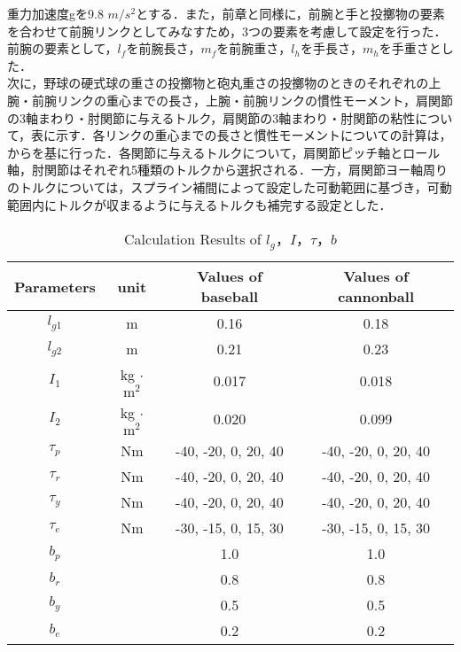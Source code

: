 重力加速度gを9.8 $m/s^{2}$とする．また，前章と同様に，前腕と手と投擲物の要素を合わせて前腕リンクとしてみなすため，3つの要素を考慮して設定を行った．
前腕の要素として，$l_{f}$を前腕長さ，$m_{f}$を前腕重さ，$l_{h}$を手長さ，$m_{h}$を手重さとした．\\

次に，野球の硬式球の重さの投擲物と砲丸重さの投擲物のときのそれぞれの上腕・前腕リンクの重心までの長さ，上腕・前腕リンクの慣性モーメント，肩関節の3軸まわり・肘関節に与えるトルク，肩関節の3軸まわり・肘関節の粘性について，表に示す．各リンクの重心までの長さと慣性モーメントについての計算は，からを基に行った．各関節に与えるトルクについて，肩関節ピッチ軸とロール軸，肘関節はそれぞれ5種類のトルクから選択される．一方，肩関節ヨー軸周りのトルクについては，スプライン補間によって設定した可動範囲に基づき，可動範囲内にトルクが収まるように与えるトルクも補完する設定とした．

\begin{table}[tb]
  \begin{center}
    \caption{Calculation Results of $l_{g}$，$I$，$\tau$，$b$}

    \begin{tabular}{c|c|c|c}
      \hline
      Parameters & unit & Values of baseball & Values of cannonball \\
      \hline
      $l_{g1}$ & m & 0.16 & 0.18 \\
      $l_{g2}$ & m & 0.21 & 0.23 \\
      $I_{1}$ & kg $\cdot$ $\mathrm{m}^2$ & 0.017 & 0.018 \\
      $I_{2}$ & kg $\cdot$ $\mathrm{m}^2$ & 0.020 & 0.099 \\
      $\tau_{p}$ & Nm & -40, -20, 0, 20, 40 & -40, -20, 0, 20, 40 \\
      $\tau_{r}$ & Nm & -40, -20, 0, 20, 40 & -40, -20, 0, 20, 40 \\
      $\tau_{y}$ & Nm & -40, -20, 0, 20, 40 & -40, -20, 0, 20, 40 \\
      $\tau_{e}$ & Nm & -30, -15, 0, 15, 30 & -30, -15, 0, 15, 30 \\
      $b_{p}$ &  & 1.0 & 1.0\\
      $b_{r}$ &  & 0.8 & 0.8\\
      $b_{y}$ &  & 0.5 & 0.5\\
      $b_{e}$ &  & 0.2 & 0.2\\
      \hline
    \end{tabular}
  \end{center}
\end{table}

